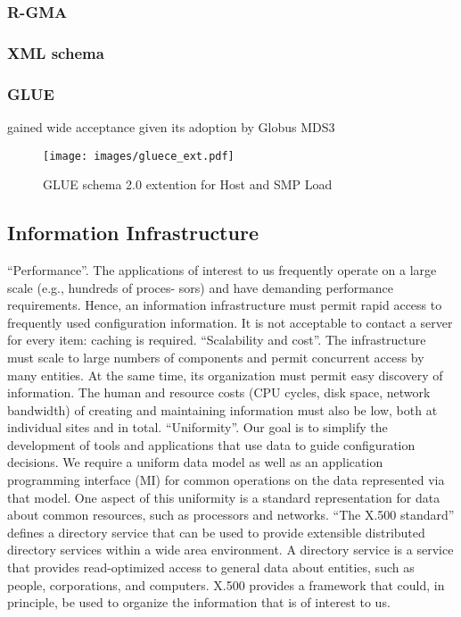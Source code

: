 \subsubsection{R-GMA}
\newpage

\subsubsection{XML schema}
\subsubsection{GLUE}
gained wide acceptance given its adoption by Globus MDS3
\newpage

\begin{figure}[htb]
\centering
 \texttt{[image: images/gluece\_ext.pdf]}
\caption{GLUE schema 2.0 extention for Host and SMP Load}
\label{figure:gluece_ext}
\end{figure}

\newpage

\subsection{Information Infrastructure}
``Performance''.  The applications of interest to us frequently 
operate on  a  large scale  (e.g.,  hundreds  of  proces- 
sors) and have demanding performance requirements. 
Hence, an information infrastructure must permit rapid 
access to frequently used configuration information. It 
is not acceptable to contact  a  server  for every  item: 
caching is required.
``Scalability and cost''. The infrastructure must scale to large
numbers of components and permit concurrent access
by many entities. At the same time, its organization
must permit easy discovery of information. The human
and resource costs (CPU cycles, disk space, network
bandwidth) of creating and maintaining information
must also be low, both at individual sites and in total.
``Uniformity''. Our goal is to simplify the development of
tools and applications that use data to guide configuration
decisions. We require a uniform data model
as well as an application programming interface (MI)
for common operations on the data represented via that
model. One aspect of this uniformity is a standard representation
for data about common resources, such as
processors and networks.
``The X.500 standard'' defines a directory service
that can be used to provide extensible distributed directory
services within a wide area environment. A directory service
is a service that provides read-optimized access to general
data about entities, such as people, corporations, and computers.
X.500 provides a framework that could, in principle,
be used to organize the information that is of interest to us.
\cite{mds1}
\newpage

